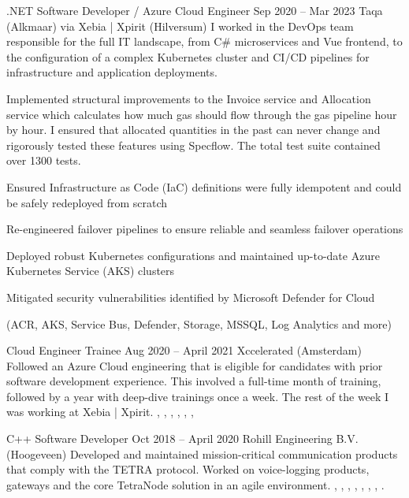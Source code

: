 \workentry
{.NET Software Developer / Azure Cloud Engineer}
{Sep 2020 -- Mar 2023}
{Taqa (Alkmaar) via Xebia | Xpirit (Hilversum)}
{ I worked in the DevOps team responsible for the full IT landscape, from C\# microservices and Vue frontend, to the configuration of a complex Kubernetes cluster and CI/CD pipelines for infrastructure and application deployments.}
{
\item Implemented structural improvements to the Invoice service and Allocation service which calculates how much gas should flow through the gas pipeline hour by hour. I ensured that allocated quantities in the past can never change and rigorously tested these features using Specflow. The total test suite contained over 1300 tests.
\item Ensured Infrastructure as Code (IaC) definitions were fully idempotent and could be safely redeployed from scratch
\item Re-engineered failover pipelines to ensure reliable and seamless failover operations
\item Deployed robust Kubernetes configurations and maintained up-to-date Azure Kubernetes Service (AKS) clusters
\item Mitigated security vulnerabilities identified by Microsoft Defender for Cloud

}
{
     (ACR, AKS, Service Bus, Defender, Storage, MSSQL, Log Analytics and more)
}

\workentryshort
{Cloud Engineer Trainee}
{Aug 2020 -- April 2021}
{Xccelerated (Amsterdam)}
{Followed an Azure Cloud engineering that is eligible for candidates with prior software development experience. This involved a full-time month of training, followed by a year with deep-dive trainings once a week. The rest of the week I was working at Xebia | Xpirit.
}
{
    , 
    , 
    , 
    , 
    , 
    , 
}

\workentryshort
{C++ Software Developer}
{Oct 2018 -- April 2020}
{Rohill Engineering B.V. (Hoogeveen)}
{Developed and maintained mission-critical communication products that comply with the TETRA protocol. Worked on voice-logging products, gateways and the core TetraNode solution in an agile environment.
}
{
    , 
    , 
    , 
    , 
    , 
    , 
    , 
    .
}


